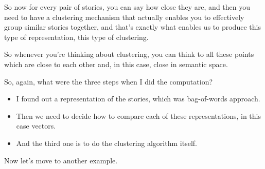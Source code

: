 \documentclass[a4paper, 12pt]{article}
\begin{document}
So now for every pair of stories, you can say how close they are, and then you
need to have a clustering mechanism that actually enables you to effectively
group similar stories together, and that's exactly what enables us to produce
this type of representation, this type of clustering.

So whenever you're thinking about clustering, you can think to all these points
which are close to each other and, in this case, close in semantic space.

So, again, what were the three steps when I did the computation?

\begin{itemize}
\item I found out a representation of the stories, which was bag-of-words approach.
\item Then we need to decide how to compare each of these representations, in this
case vectors.
\item And the third one is to do the clustering algorithm itself.
\end{itemize}

Now let's move to another example.
\end{document}
